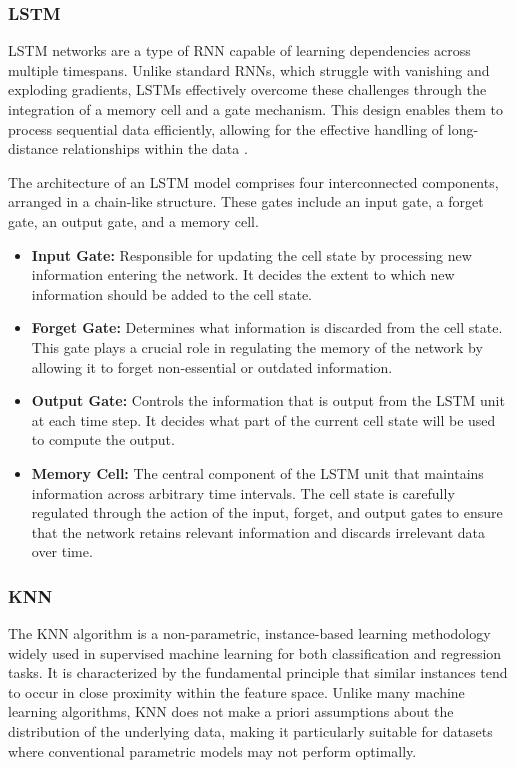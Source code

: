 \documentclass{article} %
\begin{document}
\subsubsection{LSTM}
\Gls{LSTM} networks are a type of \gls{RNN} capable of learning dependencies across multiple timespans. Unlike standard \glspl{RNN}, which struggle with vanishing and exploding gradients, LSTMs effectively overcome these challenges through the integration of a memory cell and a gate mechanism. This design enables them to process sequential data efficiently, allowing for the effective handling of long-distance relationships within the data \cite{hochreiter1997long}.

The architecture of an \Gls{LSTM} model comprises four interconnected components, arranged in a chain-like structure. These gates include an input gate, a forget gate, an output gate, and a memory cell.

\begin{itemize}
    \item \textbf{Input Gate:} Responsible for updating the cell state by processing new information entering the network. It decides the extent to which new information should be added to the cell state.
    \item \textbf{Forget Gate:} Determines what information is discarded from the cell state. This gate plays a crucial role in regulating the memory of the network by allowing it to forget non-essential or outdated information.
    \item \textbf{Output Gate:} Controls the information that is output from the LSTM unit at each time step. It decides what part of the current cell state will be used to compute the output.
    \item \textbf{Memory Cell:} The central component of the LSTM unit that maintains information across arbitrary time intervals. The cell state is carefully regulated through the action of the input, forget, and output gates to ensure that the network retains relevant information and discards irrelevant data over time.
\end{itemize}


\subsubsection{KNN}
The \gls{KNN} algorithm is a non-parametric, instance-based learning methodology widely used in supervised machine learning for both classification and regression tasks. It is characterized by the fundamental principle that similar instances tend to occur in close proximity within the feature space. Unlike many machine learning algorithms, \gls{KNN} does not make a priori assumptions about the distribution of the underlying data, making it particularly suitable for datasets where conventional parametric models may not perform optimally.
\end{document}
